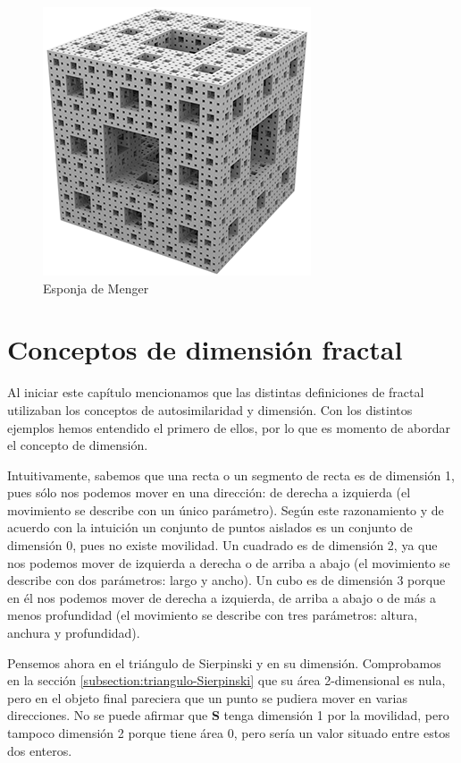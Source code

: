 \begin{figure} [h]
\centering
\includegraphics[scale = 0.6]{img/esponja_menger.png}
\caption{Esponja de Menger}
 \label{fig:esponja-menger}
\end{figure}

\section{Conceptos de dimensión fractal}
\label{section:dimension}

Al iniciar este capítulo mencionamos que las distintas definiciones de fractal utilizaban los conceptos de autosimilaridad y dimensión. Con los distintos ejemplos hemos entendido el primero de ellos, por lo que es momento de abordar el concepto de dimensión. 

Intuitivamente, sabemos que una recta o un segmento de recta es de dimensión 1, pues sólo nos podemos mover en una dirección: de derecha a izquierda (el movimiento se describe con un único parámetro). Según este razonamiento y de acuerdo con la intuición un conjunto de puntos aislados es un conjunto de dimensión 0, pues no existe movilidad. Un cuadrado es de dimensión 2, ya que nos podemos mover de izquierda a derecha o de arriba a abajo (el movimiento se describe con dos parámetros: largo y ancho). Un cubo es de dimensión 3 porque en él nos podemos mover de derecha a izquierda, de arriba a abajo o de más a menos profundidad (el movimiento se describe con tres parámetros: altura, anchura y profundidad). 

Pensemos ahora en el triángulo de Sierpinski y en su dimensión. Comprobamos en la sección \ref{subsection:triangulo-Sierpinski} que su área 2-dimensional es nula, pero en el objeto final pareciera que un punto se pudiera mover en varias direcciones. No se puede afirmar que \textbf{S} tenga dimensión 1 por la movilidad, pero tampoco dimensión 2 porque tiene área 0, pero sería un valor situado entre estos dos enteros.

